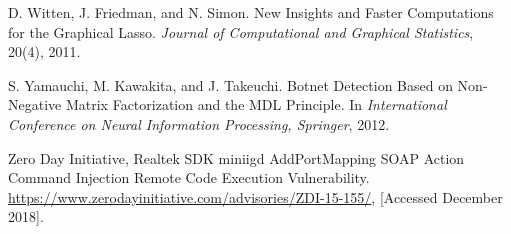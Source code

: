 \documentclass[letterpaper]{sig-alternate-10pt}
\begin{document}
\begin{thebibliography}{100}
D. Witten, J. Friedman, and N. Simon. New Insights and Faster Computations for the Graphical Lasso. {\it Journal of Computational and Graphical Statistics}, 20(4), 2011.

S. Yamauchi, M. Kawakita, and J. Takeuchi. Botnet Detection Based on Non-Negative Matrix Factorization and the MDL Principle. In {\it International Conference on Neural Information Processing, Springer}, 2012.

Zero Day Initiative, Realtek SDK miniigd AddPortMapping SOAP Action Command Injection Remote Code Execution Vulnerability. \url{https://www.zerodayinitiative.com/advisories/ZDI-15-155/}, [Accessed December 2018].

\end{thebibliography}
\end{document}
